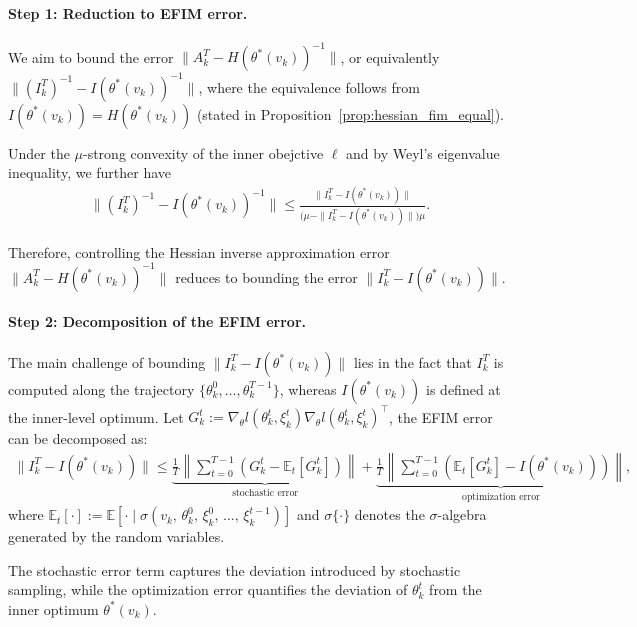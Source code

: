 \documentclass[11 pt]{article}
\begin{document}
\paragraph{Step 1: Reduction to EFIM error.}
We aim to bound the error $\|A_k^T - H(\theta^*(v_k))^{-1}\|$, or equivalently $\|(I_k^T)^{-1} - I(\theta^*(v_k))^{-1}\|$, where the equivalence follows from $I(\theta^*(v_k)) = H(\theta^*(v_k))$ (stated in Proposition~\ref{prop:hessian_fim_equal}). 

Under the $\mu$-strong convexity of the inner obejctive $\ell$ and by Weyl’s eigenvalue inequality, we further have  
\begin{align*}
    \bigl\|(I_k^{T})^{-1} - I(\theta^*(v_k))^{-1} \bigr\|
\le 
\frac{\|I_k^{T} - I(\theta^*(v_k))\|}{\bigl(\mu - \|I_k^{T} - I(\theta^*(v_k))\|\bigr)\mu}.
\end{align*}

Therefore, controlling the Hessian inverse approximation error $\|A_k^T - H(\theta^*(v_k))^{-1}\|$ reduces to bounding the 
error $\|I_k^{T} - I(\theta^*(v_k))\|$.

\paragraph{Step 2: Decomposition of the EFIM error.}
The main challenge of bounding $\|I_k^{T} - I(\theta^*(v_k))\|$ lies in the fact that $I_k^{T}$ is computed along the trajectory 
$\{\theta_k^0,\ldots,\theta_k^{T-1}\}$, whereas $I(\theta^*(v_k))$ is defined at the inner-level optimum.  
Let $G_k^t:=\nabla_\theta l(\theta_k^{t},\xi_k^t)\nabla_\theta l(\theta_k^{t},\xi_k^t)^\top$, the EFIM error can be decomposed as:
\begingroup
\small
\begin{align*}
\|I_k^{T} - I(\theta^*(v_k))\|\leq \underbrace{\frac{1}{T}\left\|
\sum_{t=0}^{T-1}
\left(
G_k^t -
\mathbb{E}_t[G_k^t]
\right)
\right\|}_{\text{stochastic error}}+\underbrace{\frac{1}{T}\left\|
\sum_{t=0}^{T-1}
\left(
\mathbb{E}_t[
G_k^t]-
I(\theta^*(v_k))
\right)
\right\|}_{\text{optimization error}},
\end{align*}
\endgroup
where $\mathbb{E}_t[\cdot]:=\mathbb{E}[\cdot\mid \sigma\!( v_k,\, \theta_k^0,\, \xi_k^0,\, \ldots,\, \xi_k^{t-1} )]$ and $\sigma\{\cdot\}$ denotes the $\sigma$-algebra generated by the random variables.

The stochastic error term captures the deviation introduced by stochastic sampling, while the optimization error quantifies the deviation of $\theta_k^t$ from the inner optimum $\theta^*(v_k)$.
\end{document}
